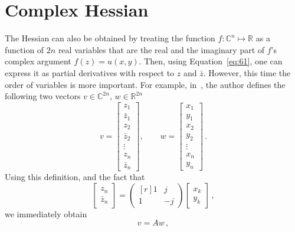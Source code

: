 \section{Complex Hessian}
\label{sec:complex-hessian}
The Hessian can also be obtained by treating the function $f:\mathbb
C^{n}\mapsto \mathbb R$ as a
function of $2n$ real variables that are the real and the imaginary part
of $f$'s complex argument $f(z) = u(x,y)$. Then, using
Equation~\eqref{eq:61}, one can express it as partial derivatives with
respect to $z$ and
$\bar z$. However, this time the order of variables is more
important. For example, in~, the author
defines the following two vectors $v\in\mathbb C^{2n}$, $w\in\mathbb R^{2n}$
\begin{equation}
  \label{eq:72}
  v = 
  \begin{bmatrix}
     z_{1}\\
     \bar{z}_{1}\\
      z_{2}\\
      \bar{z}_{2}\\
     \vdots\\
     z_{n}\\
     \bar{z}_{n}
   \end{bmatrix}, \qquad
   w = 
   \begin{bmatrix}
      x_{1}\\
      y_{1}\\
      x_{2}\\
      y_{2}\\
     \vdots\\
     x_{n}\\
     y_{n}
   \end{bmatrix} \,.
\end{equation}
Using this definition, and the fact that
\begin{equation}
  \label{eq:74}
  \begin{bmatrix}
    z_{n}\\
    \bar{z}_{n}
  \end{bmatrix}
  =
  \begin{pmatrix*}[r]
    1 & j \\
    1 & -j
  \end{pmatrix*}
  \begin{bmatrix}
    x_{k}\\
    y_{k}
  \end{bmatrix} \,, 
\end{equation}
we immediately obtain 
\begin{equation}
  \label{eq:75}
  v = Aw \,, 
\end{equation}
